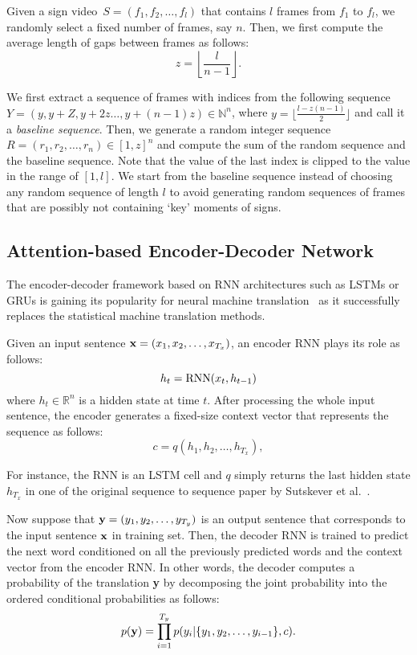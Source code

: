 \documentclass[10pt,twocolumn,letterpaper]{article}
\begin{document}
Given a sign video~$S = (f_1, f_2, \ldots, f_l )$ that contains $l$ frames from $f_1$ to $f_l$, we randomly select a fixed number of frames, say $n$. Then, we first compute the average length of gaps between frames as follows:
\[
z = \left\lfloor\dfrac{l}{n-1}\right\rfloor.
\]

We first extract a sequence of frames with indices from the following sequence $Y =(y, y +Z, y+ 2z \ldots, y + (n-1)z ) \in \mathbb{N}^n$, where $y = \lfloor\frac{l - z(n-1)}{2}\rfloor$ and call it a {\em baseline sequence}. Then, we generate a random integer sequence $R = (r_1,r_2, \ldots, r_n) \in [1,z]^n$ and compute the sum 
of the random sequence and the baseline sequence. Note that the value of the last index is clipped to the value in the range of $[1,l]$. We start from the baseline sequence instead of choosing any random sequence of length $l$ to avoid generating random sequences of frames that are possibly not containing `key' moments of signs.


\subsection{Attention-based Encoder-Decoder Network}

The encoder-decoder framework based on RNN architectures such as LSTMs or GRUs is gaining its popularity for neural machine translation~\cite{BahdanauCB14,LuongPM15,SutskeverVL14,VaswaniSPUJGKP17} as it successfully replaces the statistical machine translation methods.

Given an input sentence ${\bf x} = (x_1, x_2, \ldots, x_{T_x})$, an 
encoder RNN plays its role as follows:
\[
h_t = {\rm RNN}(x_t, h_{t-1})
\]
where $h_t \in \mathbb{R}^n$ is a hidden state at time $t$. After processing the whole input sentence, the encoder generates a fixed-size context vector that represents the  sequence as follows:
\[
c = q(h_1, h_2, \ldots, h_{T_x}),
\]
 
For instance, the RNN is an LSTM cell and $q$ simply returns the last hidden state $h_{T_x}$ in one of the original sequence to sequence paper by Sutskever et al.~\cite{SutskeverVL14}. 

Now suppose that ${\bf y} = (y_1, y_2, \ldots, y_{T_y})$ is an output sentence that corresponds to the input sentence ${\bf x}$ in training set. Then, the decoder RNN is trained to predict the next word conditioned on all the previously predicted words and the context vector from the encoder RNN. In other words, the decoder computes a probability of the translation {\bf y} by decomposing the joint probability into the ordered conditional probabilities as follows:
\[
p({\bf y}) = \prod_{i=1}^{T_y} p(y_i | \{ y_1, y_2, \ldots, y_{i-1}\}, c).
\]
\end{document}
